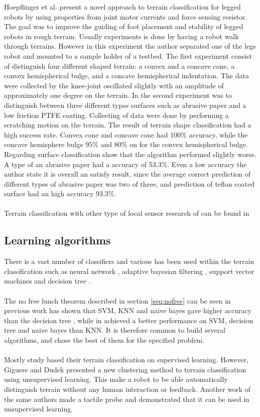 \documentclass[USenglish]{ifimaster}  %
\begin{document}
Hoepflinger et al. \cite{5509309} present a novel approach to terrain classification for legged robots by using properties from joint motor currents and force sensing resistor. The goal was to improve the guiding of foot placement and stability of legged robots in rough terrain. Usually experiments is done by having a robot walk through terrains. However in this experiment the author separated one of the legs robot and mounted to a sample holder of a testbed. The first experiment consist of distinguish four different shaped terrain: a convex and a concave cone, a convex hemispherical bulge, and a concave hemispherical indentation. The data were collected by the knee-joint oscillated slightly with an amplitude of approximately one degree on the terrain. In the second experiment was to distinguish between three different types surfaces such as abrasive paper and a low friction PTFE coating. Collecting of data were done by performing a scratching motion on the terrain. The result of terrain shape classification had a high success rate. Convex cone and concave cone had 100\% accuracy, while the concave hemisphere bulge 95\% and 80\% on for the convex hemispherical bulge. Regarding surface classification show that the algorithm performed slightly worse. A type of an abrasive paper had a accuracy of 53.3\%. Even a low accuracy the author state it is overall an satisfy result, since the average correct prediction of different types of abrasive paper was two of three, and prediction of teflon coated surface had an high accuracy 93.3\%.
\\
\\
Terrain classification with other type of local sensor research of can be found in \cite{Giguere2009,6386243,6569179,6569179,4399500}
	
\subsection{Learning algorithms}
There is a vast number of classifiers and various has been used within the terrain classification such as neural network \cite{6784609,5752869,4654717}, adaptive bayesian filtering \cite{5152327,6849778}, support vector machines \cite{5602459,4161556,4059113} and decision tree \cite{6849778}.
\\
\\
The no free lunch theorem described in section \ref{seq:nofree} can be seen in previous work has shown that SVM, KNN and naive bayes gave higher accuracy than the decision tree \cite{DBLP:conf/emcr/WeissFSZ07}, while in \cite{6849778} achieved a better performance on SVM, decision tree and naive bayes than KNN. It is therefore common to build several algorithms, and chose the best of them for the specified problem. 
\\
\\
Mostly study based their terrain classification on supervised learning. However, Giguere and Dudek \cite{Giguere2009} presented a new clustering method to terrain classification using unsupervised learning. This make a robot to be able automatically distinguish terrain without any human interaction or feedback. Another work of the same authors  \cite{5752869} made a tactile probe and demonstrated that it can be used in unsupervised learning.
	
\end{document}

